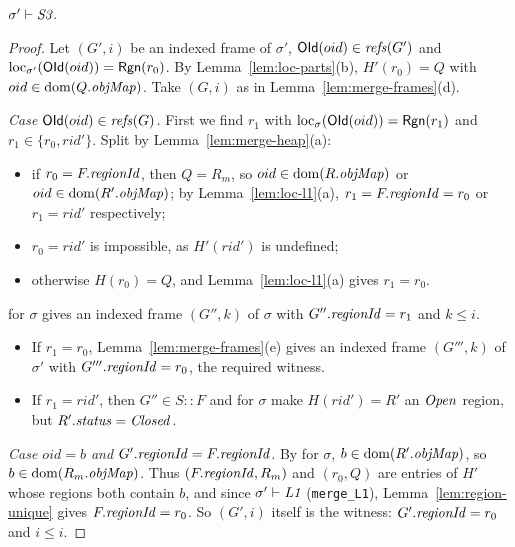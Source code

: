 \begin{lemma}[\inv{S3}] 
$\sigma' \vdash \textit{S3}$.
\end{lemma}
\begin{proof}
Let $(G', i)$ be an indexed frame of $\sigma'$, $\mathsf{OId}(oid) \in \mathit{refs}(G')$ and $\mathrm{loc}_{\sigma'}(\mathsf{OId}(oid)) = \mathsf{Rgn}(r_0)$. By
Lemma~\ref{lem:loc-parts}(b), $H'(r_0) = Q$ with $oid \in \mathrm{dom}(Q.\mathit{objMap})$. Take $(G, i)$
as in Lemma~\ref{lem:merge-frames}(d).

\emph{Case $\mathsf{OId}(oid) \in \mathit{refs}(G)$.} First we find $r_1$ with $\mathrm{loc}_{\sigma}(\mathsf{OId}(oid)) = \mathsf{Rgn}(r_1)$
and $r_1 \in \{r_0, rid'\}$. Split by Lemma~\ref{lem:merge-heap}(a):
\begin{itemize}[nosep]
  \item if $r_0 = F.\mathit{regionId}$, then $Q = R_m$, so $oid \in \mathrm{dom}(R.\mathit{objMap})$ or $oid \in \mathrm{dom}(R'.\mathit{objMap})$; by
    Lemma~\ref{lem:loc-l1}(a), $r_1 = F.\mathit{regionId} = r_0$ or $r_1 = rid'$ respectively;
  \item $r_0 = rid'$ is impossible, as $H'(rid')$ is undefined;
  \item otherwise $H(r_0) = Q$, and Lemma~\ref{lem:loc-l1}(a) gives $r_1 = r_0$.
\end{itemize}
 for $\sigma$ gives an indexed frame $(G'', k)$ of $\sigma$ with $G''.\mathit{regionId} = r_1$ and $k \le i$.
\begin{itemize}[nosep]
  \item If $r_1 = r_0$, Lemma~\ref{lem:merge-frames}(e) gives an indexed frame
    $(G''', k)$ of $\sigma'$ with $G'''.\mathit{regionId} = r_0$, the required witness.
  \item If $r_1 = rid'$, then $G'' \in S :: F$ and  for $\sigma$ make $H(rid') = R'$ an
    $\mathit{Open}$ region, but $R'.\mathit{status} = \mathit{Closed}$.
\end{itemize}

\emph{Case $oid = b$ and $G'.\mathit{regionId} = F.\mathit{regionId}$.} By  for $\sigma$, $b \in \mathrm{dom}(R'.\mathit{objMap})$, so
$b \in \mathrm{dom}(R_m.\mathit{objMap})$. Thus $(F.\mathit{regionId}, R_m)$ and $(r_0, Q)$ are entries of $H'$ whose regions both
contain $b$, and since $\sigma' \vdash \textit{L1}$ (\texttt{merge\_L1}), Lemma~\ref{lem:region-unique}
gives $F.\mathit{regionId} = r_0$. So $(G', i)$ itself is the witness: $G'.\mathit{regionId} = r_0$ and $i \le i$.
\end{proof}

